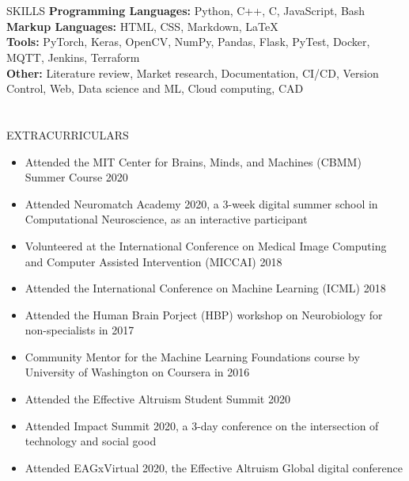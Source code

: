 \documentclass{my_cv}
\begin{document}
\section{\faList}{SKILLS}
    \textbf{Programming Languages:} Python, C++, C, JavaScript, Bash \\
    \textbf{Markup Languages:} HTML, CSS, Markdown, \LaTeX \\
    \noindent\textbf{Tools:} PyTorch, Keras, OpenCV, NumPy, Pandas, Flask, PyTest, Docker, MQTT, Jenkins, Terraform \\
    \noindent\textbf{Other:} Literature review, Market research, Documentation, CI/CD, Version Control, Web, Data science and ML, Cloud computing, CAD

\section{\faStar}{EXTRACURRICULARS}
    \begin{itemize}
        \item Attended the MIT Center for Brains, Minds, and Machines (CBMM) Summer Course 2020
        \item Attended Neuromatch Academy 2020, a 3-week digital summer school in Computational Neuroscience, as an interactive participant
        \item Volunteered at the International Conference on Medical Image Computing and Computer Assisted Intervention (MICCAI) 2018
        \item Attended the International Conference on Machine Learning (ICML) 2018
        \item Attended the Human Brain Porject (HBP) workshop on Neurobiology for non-specialists in 2017
        \item Community Mentor for the Machine Learning Foundations course by University of Washington on Coursera in 2016
        \item Attended the Effective Altruism Student Summit 2020
        \item Attended Impact Summit 2020, a 3-day conference on the intersection of technology and social good
        \item Attended EAGxVirtual 2020, the Effective Altruism Global digital conference
    \end{itemize}
\end{document}
